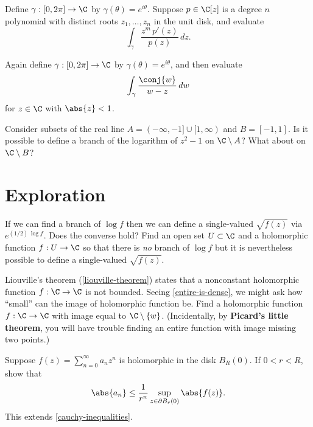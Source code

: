 \documentclass{homework}
\begin{document}
\begin{problem}
  Define $\gamma : [0,2\pi] \to \C$ by $\gamma(\theta) = e^{i\theta}$.
  Suppose $p \in \C[z]$ is a degree $n$ polynomial with distinct roots
  $z_1,\ldots,z_n$ in the unit disk, and evaluate
  \[
    \int_\gamma \frac{z^m \, p'(z)}{p(z)} \, dz.
  \]
\end{problem}

\begin{problem}
  Again define $\gamma : [0,2\pi] \to \C$ by
  $\gamma(\theta) = e^{i\theta}$, and then evaluate
  \[
    \int_\gamma \frac{\conj{w}}{w - z} \, dw
  \] for $z \in \C$ with $\abs{z} < 1$.
\end{problem}

\begin{problem}
  Consider subsets of the real line $A = (-\infty,-1] \cup [1,\infty)$
  and $B = [-1,1]$.  Is it possible to define a branch of the
  logarithm of $z^2 - 1$ on $\C \setminus A$?  What about on
  $\C \setminus B$?
\end{problem}

\section{Exploration}

\begin{problem}
  If we can find a branch of $\log f$ then we can define a
  single-valued $\sqrt{f(z)}$ via $e^{(1/2) \, \log f}$.  Does the
  converse hold?  Find an open set $U \subset \C$ and a holomorphic
  function $f : U \to \C$ so that there is \textit{no} branch of
  $\log f$ but it is nevertheless possible to define a single-valued
  $\sqrt{f(z)}$.
\end{problem}

\begin{problem}
  Liouville's theorem (\ref{liouville-theorem}) states that a
  nonconstant holomorphic function $f : \C \to \C$ is not bounded.
  Seeing \ref{entire-is-dense}, we might ask how ``small'' can the
  image of holomorphic function be.  Find a holomorphic function
  $f : \C \to \C$ with image equal to $\C \setminus \{w\}$.
  (Incidentally, by \textbf{Picard's little theorem}, you will have
  trouble finding an entire function with image missing two points.)
\end{problem}

\begin{problem}\label{cauchy-inequalities-2}Suppose
  $f(z) = \sum_{n=0}^\infty a_n z^n$ is holomorphic in the disk
  $B_R(0)$.  If $0 < r < R$, show that
  \[
    \abs{a_n} \leq \frac{1}{r^n} \displaystyle\sup_{z \in \partial B_r(0)} \abs{f(z)}.
  \]
  This extends \ref{cauchy-inequalities}.
\end{problem}
\end{document}
